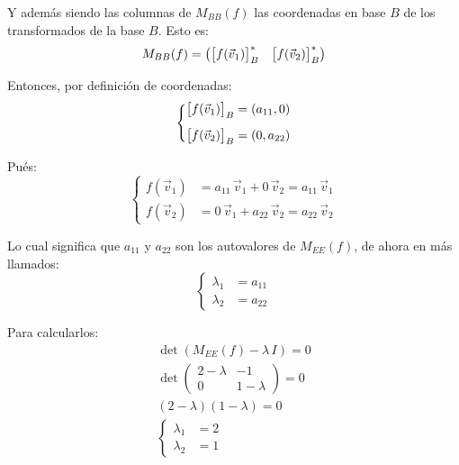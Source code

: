 \documentclass[a5paper,12pt,twoside]{book}
\begin{document}
\begin{mdframed}[style=MyFrame2]
    Y además siendo las columnas de $M_{BB}(f)$ las coordenadas en base $B$ de los transformados de la base $B$. Esto es:
    \begin{equation*}
        M_{BB}(f) =
        \begin{pmatrix}
            { \begin{bmatrix} f(\Vec{v}_1) \end{bmatrix} }_B^* & { \begin{bmatrix} f(\Vec{v}_2) \end{bmatrix} }_B^*
        \end{pmatrix}
    \end{equation*}
    
    Entonces, por definición de coordenadas:
    \begin{equation*}
        \left\{
        \begin{aligned}
            { \begin{bmatrix} f(\Vec{v}_1) \end{bmatrix} }_B &= (a_{11} , 0)
            \\[1ex]
            { \begin{bmatrix} f(\Vec{v}_2) \end{bmatrix} }_B &= (0 , a_{22})
        \end{aligned}
        \right.
    \end{equation*}
    
    Pués:
    \begin{equation*}
        \left\{
        \begin{aligned}
            f(\Vec{v}_1) &= a_{11} \, \Vec{v}_1 + 0 \, \Vec{v}_2 = a_{11} \, \Vec{v}_1
            \\
            f(\Vec{v}_2) &= 0 \, \Vec{v}_1 + a_{22} \, \Vec{v}_2 = a_{22} \, \Vec{v}_2
        \end{aligned}
        \right.
    \end{equation*}
    
    Lo cual significa que $a_{11}$ y $a_{22}$ son los autovalores de $M_{EE}(f)$, de ahora en más llamados:
    \begin{equation*}
        \left\{
        \begin{aligned}
        \lambda_1 &= a_{11}
        \\
        \lambda_2 &= a_{22}
        \end{aligned}
        \right.
    \end{equation*}
    
    Para calcularlos:
    \begin{gather*}
        \operatorname{det} \left( M_{EE}(f) - \lambda \, I \right) = 0
        \\[1ex]
        \operatorname{det}
        \begin{pmatrix}
            2-\lambda & -1
            \\
            0 & 1-\lambda
        \end{pmatrix}
        = 0
        \\[1ex]
        \left( 2-\lambda \right) \left( 1-\lambda \right) = 0
        \\[1ex]
        \left\{
        \begin{aligned}
        \lambda_1 &= 2
        \\
        \lambda_2 &= 1
        \end{aligned}
        \right.
    \end{gather*}
    

\end{mdframed}
\end{document}
